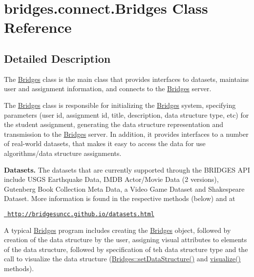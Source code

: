 \hypertarget{classbridges_1_1connect_1_1_bridges}{}\section{bridges.\+connect.\+Bridges Class Reference}
\label{classbridges_1_1connect_1_1_bridges}


\subsection{Detailed Description}
The \mbox{\hyperlink{classbridges_1_1connect_1_1_bridges}{Bridges}} class is the main class that provides interfaces to datasets, maintains user and assignment information, and connects to the \mbox{\hyperlink{classbridges_1_1connect_1_1_bridges}{Bridges}} server. 

The \mbox{\hyperlink{classbridges_1_1connect_1_1_bridges}{Bridges}} class is responsible for initializing the \mbox{\hyperlink{classbridges_1_1connect_1_1_bridges}{Bridges}} system, specifying parameters (user id, assignment id, title, description, data structure type, etc) for the student assignment, generating the data structure representation and transmission to the \mbox{\hyperlink{classbridges_1_1connect_1_1_bridges}{Bridges}} server. In addition, it provides interfaces to a number of real-\/world datasets, that makes it easy to access the data for use algorithms/data structure assignments. ~\newline


{\bfseries{Datasets.}} The datasets that are currently supported through the B\+R\+I\+D\+G\+ES A\+PI include U\+S\+GS Earthquake Data, I\+M\+DB Actor/\+Movie Data (2 versions), Gutenberg Book Collection Meta Data, a Video Game Dataset and Shakespeare Dataset. More information is found in the respective methods (below) and at 

\href{http://bridgesuncc.github.io/datasets.html}{\texttt{ http\+://bridgesuncc.\+github.\+io/datasets.\+html}} 

A typical \mbox{\hyperlink{classbridges_1_1connect_1_1_bridges}{Bridges}} program includes creating the \mbox{\hyperlink{classbridges_1_1connect_1_1_bridges}{Bridges}} object, followed by creation of the data structure by the user, assigning visual attributes to elements of the data structure, followed by specification of teh data structure type and the call to visualize the data structure (\mbox{\hyperlink{classbridges_1_1connect_1_1_bridges_a921a6603b2445b1abe30a1b3d6f0c255}{Bridges\+::set\+Data\+Structure()}} and \mbox{\hyperlink{classbridges_1_1connect_1_1_bridges_a1853d64ffb8675ba2ec227a2b819cd24}{visualize()}} methods).

